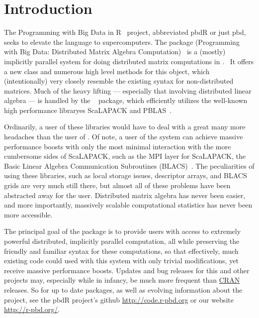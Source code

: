 
\section[]{Introduction}
\label{sec:introduction}

The Programming with Big Data in R~\citep{pbdr2012} project, abbreviated pbdR or just pbd, seeks to elevate the  language to supercomputers.  
The  package (Programming with Big Data: Distributed Matrix Algebra Computation)~\citep{Schmidt2012pbdDMATpackage} is a (mostly) implicitly parallel system for doing distributed matrix computations in .~\citep{Rcore}  It offers a new  class  and numerous high level methods for this object, which (intentionally) very closely resemble the existing  syntax for non-distributed matrices.  Much of the heavy lifting --- especially that involving distributed linear algebra --- is handled by the ~\citep{Schmidt2012pbdBASEpackage} package, which efficiently utilizes the well-known high performance libraryes ScaLAPACK and PBLAS~\citep{slug}.

Ordinarily, a user of these libraries would have to deal with a great many more headaches than the user of .  Of note, a user of the  system can achieve massive performance boosts with only the most minimal interaction with the more cumbersome sides of ScaLAPACK, such as the MPI layer for ScaLAPACK, the Basic Linear Algebra Communication Subroutines (BLACS)~\citep{blug}.  The peculiarities of using these libraries, such as local storage issues, descriptor arrays, and BLACS grids are very much still there, but almost all of these problems have been abstracted away for the user.  Distributed matrix algebra has never been easier, and more importantly, massively scalable computational statistics has never been more accessible.

The principal goal of the  package is to provide  users with access to extremely powerful distributed, implicitly parallel computation, all while preserving the friendly and familiar  syntax for these computations, so that effectively, much existing  code could used with this system with only trivial modifications, yet receive massive performance boosts.  Updates and bug releases for this and other  projects may, especially while in infancy, be much more frequent than \href{http://cran.r-project.org/}{CRAN} releases.  So for up to date packages, as well as evolving information about the  project,  see the pbdR project's github \url{http://code.r-pbd.org} or our website \href{http://r-pbd.org/}{http://r-pbd.org/}.






